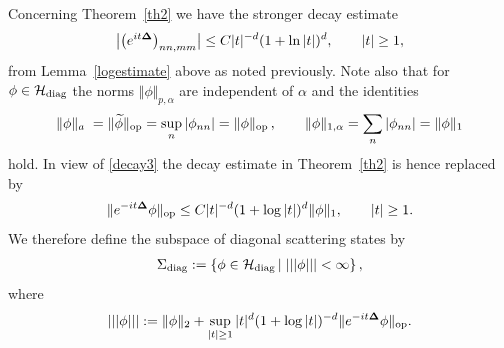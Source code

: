 \documentclass[pdftex]{sigma}
\begin{document}
Concerning Theorem~\ref{th2} we have the stronger decay estimate
\begin{gather}\label{decay3}
\big|\big(e^{it{\bf\Delta}}\big)_{nn,mm}\big| \leq  C |t|^{-d}(1+\ln |t|)^d ,\qquad |t|\geq 1 ,
\end{gather}
from Lemma~\ref{logestimate} above as noted previously.
Note also that for $\phi\in\mathcal H_{\rm diag}$ the norms $\Vert\phi\Vert_{p,\alpha}$
are independent of $\alpha$ and the identities
\begin{align*}
\Vert\phi\Vert_a\;=\Vert\widetilde\phi\Vert_{\rm op}=\sup_n|\phi_{nn}|=\Vert\phi\Vert_{\rm op}\,,\qquad
\Vert\phi\Vert_{1,\alpha}=\sum_n|\phi_{nn}| =\Vert\phi\Vert_1
\end{align*}
hold. In view of \eqref{decay3} the decay estimate in Theorem~\ref{th2} is
hence replaced by
\begin{gather}\label{decaydiag}
\Vert e^{-it{\bf\Delta}}\phi\Vert_{\rm op} \leq
C |t|^{-d} (1+\log|t|)^d \Vert\phi\Vert_1 ,\qquad |t|\geq 1 .
\end{gather}
We therefore def\/ine the subspace of diagonal scattering states by
\begin{gather*}
\Sigma_{\rm diag}:=\left\{\phi\in\mathcal H_{\rm diag}\, |\; |||\phi|||<\infty\right\} ,
\end{gather*}
where
\begin{gather*}
|||\phi|||:=
\Vert\phi\Vert_2 +\sup_{|t|\geq 1}  |t|^d (1+\log |t|)^{-d}
\Vert e^{-it{\bf\Delta}}\phi\Vert_{\rm op} .
\end{gather*}
\end{document}
